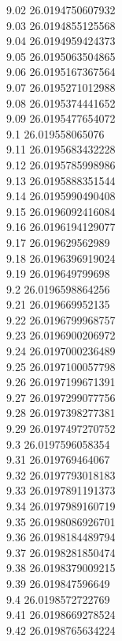 {9.02	26.0194750607932\\
9.03	26.0194855125568\\
9.04	26.0194959424373\\
9.05	26.0195063504865\\
9.06	26.0195167367564\\
9.07	26.0195271012988\\
9.08	26.0195374441652\\
9.09	26.0195477654072\\
9.1	26.019558065076\\
9.11	26.0195683432228\\
9.12	26.0195785998986\\
9.13	26.0195888351544\\
9.14	26.0195990490408\\
9.15	26.0196092416084\\
9.16	26.0196194129077\\
9.17	26.019629562989\\
9.18	26.0196396919024\\
9.19	26.019649799698\\
9.2	26.0196598864256\\
9.21	26.019669952135\\
9.22	26.0196799968757\\
9.23	26.0196900206972\\
9.24	26.0197000236489\\
9.25	26.0197100057798\\
9.26	26.0197199671391\\
9.27	26.0197299077756\\
9.28	26.0197398277381\\
9.29	26.0197497270752\\
9.3	26.0197596058354\\
9.31	26.019769464067\\
9.32	26.0197793018183\\
9.33	26.0197891191373\\
9.34	26.0197989160719\\
9.35	26.0198086926701\\
9.36	26.0198184489794\\
9.37	26.0198281850474\\
9.38	26.0198379009215\\
9.39	26.019847596649\\
9.4	26.0198572722769\\
9.41	26.0198669278524\\
9.42	26.0198765634224\\
}
